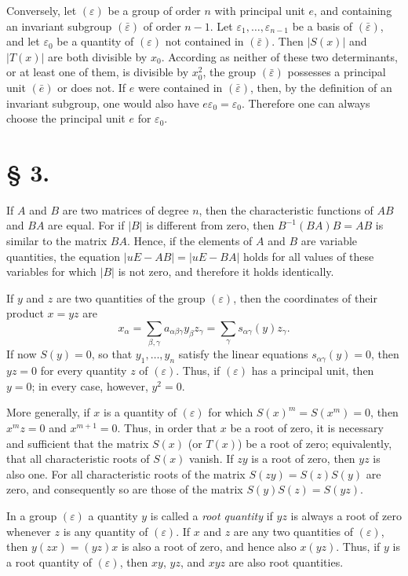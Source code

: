 \documentclass[11pt]{article}
\newcommand{\eps}{\varepsilon}
\begin{document}
Conversely, let $(\eps)$ be a group of order $n$ with principal unit $e$, and containing an invariant subgroup $(\bar\eps)$ of order $n-1$. Let $\eps_1,\ldots,\eps_{n-1}$ be a basis of $(\bar\eps)$, and let $\eps_0$ be a quantity of $(\eps)$ not contained in $(\bar\eps)$. Then $|S(x)|$ and $|T(x)|$ are both divisible by $x_0$. According as neither of these two determinants, or at least one of them, is divisible by $x_0^2$, the group $(\bar\eps)$ possesses a principal unit $(\bar e)$ or does not. If $e$ were contained in $(\bar\eps)$, then, by the definition of an invariant subgroup, one would also have $e\eps_0=\eps_0$. Therefore one can always choose the principal unit $e$ for $\eps_0$.

\section*{§ 3.}

If $A$ and $B$ are two matrices of degree $n$, then the characteristic functions of $AB$ and $BA$ are equal. For if $|B|$ is different from zero, then $B^{-1}(BA)B=AB$ is similar to the matrix $BA$. Hence, if the elements of $A$ and $B$ are variable quantities, the equation $|uE-AB|=|uE-BA|$ holds for all values of these variables for which $|B|$ is not zero, and therefore it holds identically.

If $y$ and $z$ are two quantities of the group $(\eps)$, then the coordinates of their product $x=yz$ are
\begin{equation}\tag{1.}
 x_{\alpha}=\sum_{\beta,\gamma}a_{\alpha\beta\gamma}y_{\beta}z_{\gamma}
 =\sum_{\gamma}s_{\alpha\gamma}(y)z_{\gamma}.
\end{equation}
If now $S(y)=0$, so that $y_1,\ldots,y_n$ satisfy the linear equations $s_{\alpha\gamma}(y)=0$, then $yz=0$ for every quantity $z$ of $(\eps)$. Thus, if $(\eps)$ has a principal unit, then $y=0$; in every case, however, $y^2=0$.

More generally, if $x$ is a quantity of $(\eps)$ for which $S(x)^m=S(x^m)=0$, then $x^mz=0$ and $x^{m+1}=0$. Thus, in order that $x$ be a root of zero, it is necessary and sufficient that the matrix $S(x)$ (or $T(x)$) be a root of zero; equivalently, that all characteristic roots of $S(x)$ vanish. If $zy$ is a root of zero, then $yz$ is also one. For all characteristic roots of the matrix $S(zy)=S(z)S(y)$ are zero, and consequently so are those of the matrix $S(y)S(z)=S(yz)$.

In a group $(\eps)$ a quantity $y$ is called a \emph{root quantity} if $yz$ is always a root of zero whenever $z$ is any quantity of $(\eps)$. If $x$ and $z$ are any two quantities of $(\eps)$, then $y(zx)=(yz)x$ is also a root of zero, and hence also $x(yz)$. Thus, if $y$ is a root quantity of $(\eps)$, then $xy$, $yz$, and $xyz$ are also root quantities.
\end{document}
